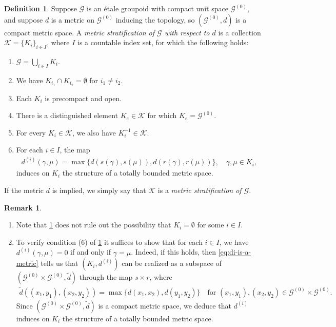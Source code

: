 \documentclass[11pt,a4paper,oneside,final,reqno]{amsart}
\theoremstyle{definition}
\newtheorem{definition}[lemma]{Definition}
\newtheorem{remark}[lemma]{Remark}
\newcommand{\G}{\mathcal{G}}
\newcommand{\Go}{\mathcal{G}^{(0)}}
\newcommand{\cK}{\mathcal{K}}
\numberwithin{equation}{section}
\begin{document}
	\begin{definition}\label{def:metric-stratification}
		Suppose $\G$ is an \'etale groupoid with compact unit space $\Go$, and suppose 
		$d$ is a metric on $\Go$ inducing the topology, so $(\Go, d)$ is a compact metric space. 
		A \emph{metric stratification of $\G$ with respect to $d$} is a collection $\cK = \{K_i\}_{i\in I}$, where $I$ is a countable index set, for which the following holds:
		\begin{enumerate}
		 	\item $\G = \bigcup_{i \in I} K_{i}$.
		 	\item We have $K_{i_{1}} \cap K_{i_{2}} = \emptyset$ for $i_1\neq i_2$.
		 	\item Each $K_{i}$ is precompact 
		 	and open.
		 	\item There is a distinguished element $K_{e} \in \cK$ for which $K_{e}  = \Go$.
		 	\item For every $K_{i} \in \cK$, we also have $K_{i}^{-1}\in \cK$. 
		 	\item For each $i\in I$, the map 
		 	\begin{align}\label{eq:di-is-a-metric}
		 		d^{(i)}(\gamma, \mu) = \max \{ d(s(\gamma), s(\mu)) , d(r(\gamma), r(\mu))  \}, \quad \gamma, \mu \in K_{i},
		 	\end{align}
		 	induces on $K_i$ the structure of a totally bounded metric space. 
		 	
		\end{enumerate}
		If the metric $d$ is implied, we simply say that $\cK$ is a \emph{metric stratification of $\G$}.
	\end{definition}
	


\begin{remark}\label{remark:comments-on-metric-stratification-def}
	\begin{enumerate}
		\item Note that \cref{def:metric-stratification} does not rule out the possibility that $K_i = \emptyset$ for some $i \in I$.
		\item To verify condition (6) of \cref{def:metric-stratification} it suffices to show that for each $i \in I$, we have $d^{(i)}(\gamma, \mu) = 0 $ if and only if $\gamma = \mu$. Indeed, if this holds, then \eqref{eq:di-is-a-metric} tells us that $(K_i , d^{(i)})$ can be realized as a subspace of $(\Go \times \Go, \tilde{d})$ through the map $s \times r$, where
		\begin{align*}
			\tilde{d}((x_1, y_1) , (x_2,y_2)) = \max \{ d(x_1,x_2) , d(y_1,y_2) \} \quad \text{for $(x_1,y_1), (x_2,y_2) \in \Go \times \Go$}.
		\end{align*}
		Since $(\Go \times \Go, \tilde{d})$ is a compact metric space, we deduce that $d^{(i)}$ induces on $K_i$ the structure of a totally bounded metric space. 
	\end{enumerate}
	 
\end{remark}
	
\end{document}
